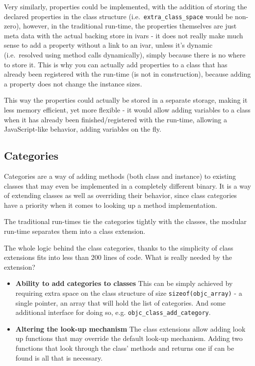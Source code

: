 Very similarly, properties could be implemented, with the addition of storing the declared properties in the class structure (i.e.\ \verb=extra_class_space= would be non-zero), however, in the traditional run-time, the properties themselves are just meta data with the actual backing store in ivars - it does not really make much sense to add a property without a link to an ivar, unless it's dynamic (i.e.\ resolved using method calls dynamically), simply because there is no where to store it. This is why you can actually add properties to a class that has already been registered with the run-time (is not in construction), because adding a property does not change the instance sizes.

This way the properties could actually be stored in a separate storage, making it less memory efficient, yet more flexible - it would allow adding variables to a class when it has already been finished/registered with the run-time, allowing a JavaScript-like behavior, adding variables on the fly.

\subsection{Categories}

Categories are a way of adding methods (both class and instance) to existing classes that may even be implemented in a completely different binary. It is a way of extending classes as well as overriding their behavior, since class categories have a priority when it comes to looking up a method implementation.

The traditional run-times tie the categories tightly with the classes, the modular run-time separates them into a class extension.

The whole logic behind the class categories, thanks to the simplicity of class extensions fits into less than 200 lines of code. What is really needed by the extension?

\begin{itemize}
  \item{\bf{Ability to add categories to classes}} This can be simply achieved by requiring extra space on the class structure of size \verb=sizeof(objc_array)= - a single pointer, an array that will hold the list of categories. And some additional interface for doing so, e.g. \verb=objc_class_add_category=.
  \item{\bf{Altering the look-up mechanism}} The class extensions allow adding look up functions that may override the default look-up mechanism. Adding two functions that look through the class' methods and returns one if can be found is all that is necessary.
\end{itemize}

